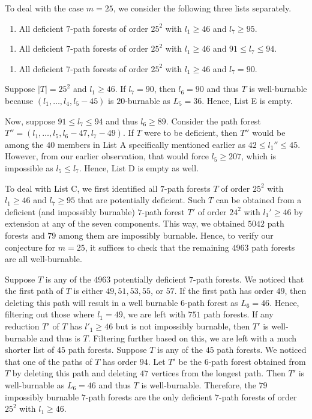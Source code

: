 \documentclass[
final
]{dmtcs-episciences}
\theoremstyle{definition}
\theoremstyle{remark}
\begin{document}
To deal with the case $m=25$, we consider the following three lists separately.
\begin{enumerate}[{List }C.]
	\item  All deficient $7$-path forests of order $25^2$ with $l_1\geq 46$ and $l_7\geq 95$. 
\end{enumerate}
\begin{enumerate}[{List }D.]
	\item All deficient $7$-path forests of order $25^2$ with $l_1\geq 46$ and $91\leq l_7\leq 94$.	
\end{enumerate}
\begin{enumerate}[{List }E.]
	\item All deficient $7$-path forests of order $25^2$ with $l_1\geq 46$ and $l_7=90$.
\end{enumerate}



Suppose $\vert T\vert=25^2$ and $l_1\geq 46$. If $l_7=90$, then $l_6=90$ and thus $T$ is well-burnable because $(l_1, \ldots, l_4, l_5-45)$ is $20$-burnable as $L_5=36$. Hence, List E is empty.


Now, suppose $91\leq l_7\leq 94$ and thus $l_6\geq 89$. Consider the path forest $T''=(l_1, \ldots, l_5, l_6-47, l_7-49)$.
If $T$ were to be deficient, then $T''$ would be among the $40$ members in List A specifically mentioned earlier as $42\leq l_1''\leq 45$. However, from our earlier observation, that would force $l_5\geq 207$, which is impossible as $l_5\leq l_7$. Hence, List D is empty as well.

To deal with List C, we first identified all $7$-path forests $T$ of order $25^2$ with $l_1\geq 46$ and $l_7\geq 95$ that are potentially deficient.
Such $T$ can be obtained from a deficient (and impossibly burnable) $7$-path forest $T'$ of order $24^2$ with $l_1'\geq 46$ by extension at any of the seven components.  This way, we obtained $5042$ path forests and $79$ among them are impossibly burnable. Hence, to verify  our conjecture for $m=25$, it suffices to check that the remaining $4963$ path forests are all well-burnable. 

Suppose $T$ is any of the $4963$ potentially deficient $7$-path forests. We noticed that the first path of $T$ is either $49,51,53,55$, or $57$. If the first path has order $49$, then deleting this path will result in a well burnable $6$-path forest  as $L_6=46$. Hence, filtering out those where $l_1=49$, we are left with $751$ path forests. If any reduction $T'$ of $T$ has $l'_1\geq  46$ but is not impossibly burnable, then $T'$ is well-burnable and thus is $T$. Filtering further based on this, we are left with a much shorter list of $45$ path forests.
Suppose $T$ is any of the $45$ path forests. We noticed that one of the paths of $T$ has order $94$. Let $T'$ be the $6$-path forest obtained from $T$ by deleting this path and deleting $47$ vertices from the longest path. Then $T'$ is well-burnable as $L_6 =46$ and thus $T$ is well-burnable. Therefore, the $79$ impossibly burnable $7$-path forests are the only deficient $7$-path forests of order $25^2$ with $l_1\geq 46$. 
\end{document}
